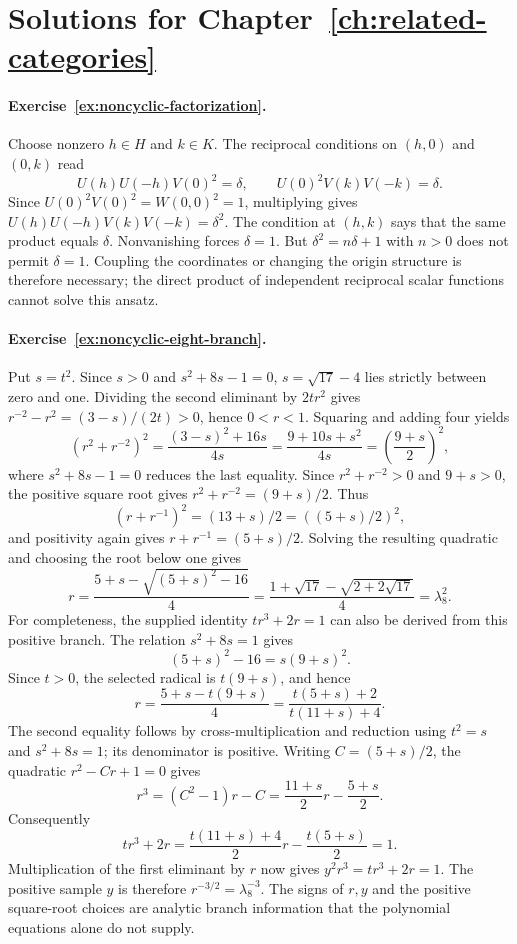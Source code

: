 \section{Solutions for Chapter~\ref{ch:related-categories}}

\paragraph{Exercise~\ref{ex:noncyclic-factorization}.}
\label{sol:ex:noncyclic-factorization}
Choose nonzero $h\in H$ and $k\in K$. The reciprocal conditions
on $(h,0)$ and $(0,k)$ read
\[
 U(h)U(-h)V(0)^2=\delta,\qquad
 U(0)^2V(k)V(-k)=\delta.
\]
Since $U(0)^2V(0)^2=W(0,0)^2=1$, multiplying gives
$U(h)U(-h)V(k)V(-k)=\delta^2$. The condition at $(h,k)$
says that the same product equals $\delta$. Nonvanishing forces
$\delta=1$. But $\delta^2=n\delta+1$ with $n>0$ does not
permit $\delta=1$. Coupling the coordinates or changing the
origin structure is therefore necessary; the direct product of
independent reciprocal scalar functions cannot solve this ansatz.



\paragraph{Exercise~\ref{ex:noncyclic-eight-branch}.}
\label{sol:ex:noncyclic-eight-branch}
Put $s=t^2$. Since $s>0$ and $s^2+8s-1=0$,
$s=\sqrt{17}-4$ lies strictly between zero and one.
Dividing the second eliminant by $2tr^2$ gives
$r^{-2}-r^2=(3-s)/(2t)>0$, hence $0<r<1$. Squaring and
adding four yields
\[
 (r^2+r^{-2})^2
 =\frac{(3-s)^2+16s}{4s}
 =\frac{9+10s+s^2}{4s}
 =\left(\frac{9+s}{2}\right)^2,
\]
where $s^2+8s-1=0$ reduces the last equality. Since
$r^2+r^{-2}>0$ and $9+s>0$, the positive square root gives
$r^2+r^{-2}=(9+s)/2$. Thus
\[
 (r+r^{-1})^2=(13+s)/2=((5+s)/2)^2,
\]
and positivity again gives $r+r^{-1}=(5+s)/2$.
Solving the resulting quadratic and choosing the root below one
gives
\[
 r=\frac{5+s-\sqrt{(5+s)^2-16}}4
  =\frac{1+\sqrt{17}-\sqrt{2+2\sqrt{17}}}{4}
  =\lambda_8^2.
\]
For completeness, the supplied identity $tr^3+2r=1$ can also
be derived from this positive branch. The relation $s^2+8s=1$
gives
\[
 (5+s)^2-16=s(9+s)^2.
\]
Since $t>0$, the selected radical is $t(9+s)$, and hence
\[
 r=\frac{5+s-t(9+s)}4
   =\frac{t(5+s)+2}{t(11+s)+4}.
\]
The second equality follows by cross-multiplication and reduction
using $t^2=s$ and $s^2+8s=1$; its denominator is positive.
Writing $C=(5+s)/2$, the quadratic $r^2-Cr+1=0$ gives
\[
 r^3=(C^2-1)r-C
     =\frac{11+s}{2}r-\frac{5+s}{2}.
\]
Consequently
\[
 tr^3+2r
 =\frac{t(11+s)+4}{2}r-\frac{t(5+s)}2=1.
\]
Multiplication of the first eliminant by
$r$ now gives $y^2r^3=tr^3+2r=1$. The positive sample $y$ is
therefore $r^{-3/2}=\lambda_8^{-3}$. The signs of $r,y$ and
the positive square-root choices are analytic branch information
that the polynomial equations alone do not supply.




